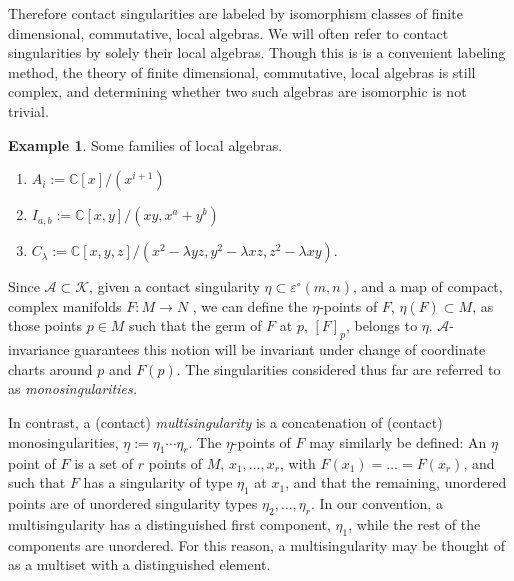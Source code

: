 \documentclass[11pt]{article}
\theoremstyle{plain}
\theoremstyle{definition}
\newtheorem{example}[fact]{Example}
\theoremstyle{definition}
\newcommand{\C}{\mathbb{C}}
\begin{document}
Therefore contact singularities are labeled by isomorphism classes of finite dimensional, commutative, local algebras. We will often refer to contact singularities by solely their local algebras. Though this is is a convenient labeling method, the theory of finite dimensional, commutative, local algebras is still complex, and determining whether two such algebras are isomorphic is not trivial. 


\begin{example}
Some families of local algebras. 
\begin{enumerate}
\item $A_i:=\C[x]/(x^{i+1})$
\item $I_{a,b} :=\C[x,y]/(xy,x^a+y^b)$
\item $C_\lambda:=\C[x,y,z]/(x^2-\lambda yz,y^2-\lambda xz,z^2-\lambda xy)$.
\end{enumerate}

\end{example}

Since $\mathcal A\subset \mathcal K$, given a contact singularity $\eta\subset \varepsilon^\circ(m,n)$, and a map of compact, complex manifolds $F: M \to N$ , we can define the $\eta$-points of $F$, $\eta(F)\subset M$, as those points $p \in M$ such that the germ of $F$ at $p$, $[F]_p$, belongs to $\eta$. $\mathcal A$-invariance guarantees this notion will be invariant under change of coordinate charts around $p$ and $F(p)$. The singularities considered thus far are referred to as \textit{monosingularities.}

In contrast, a (contact) \textit{multisingularity} is a concatenation of (contact) monosingularities, $\underline{\eta}:=\eta_1\cdots\eta_r$. The $\underline{\eta}$-points of $F$ may similarly be defined: An $\underline{\eta}$ point of $F$ is a set of $r$ points of $M$, $x_1,\dots,x_r$, with $F(x_1)=\dots =F(x_r)$, and such that $F$ has a singularity of type $\eta_1$ at $x_1$, and that the remaining, unordered points are of unordered singularity types $\eta_2,\dots,\eta_r$. In our convention, a multisingularity has a distinguished first component, $\eta_1$, while the rest of the components are unordered. For this reason, a multisingularity may be thought of as a multiset with a distinguished element. 
\end{document}
